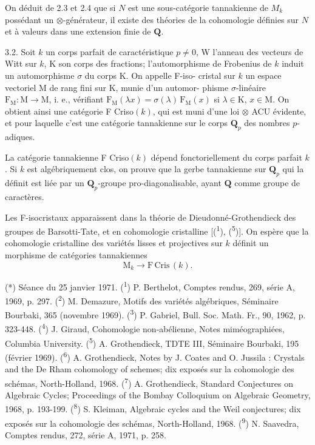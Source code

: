 \documentclass[11pt]{article}
\begin{document}
On déduit de 2.3 et 2.4 que si $N$ est une sous-catégorie tannakienne de $M_k$
possédant un $\otimes$-générateur, il existe des théories de la cohomologie définies
sur $N$ et à valeurs dans une extension finie de $\mathbf{Q}$.

3.2. Soit $k$ un corps parfait de caractéristique $p \neq 0$, W l'anneau des
vecteurs de Witt sur $k$, K son corps des fractions; l'automorphisme de
Frobenius de $k$ induit un automorphisme $\sigma$ du corps K. On appelle F-iso-%
cristal sur $k$ un espace vectoriel M de rang fini sur K, munie d'un automor-%
phisme $\sigma$-linéaire $\mathrm{F}_{\mathrm{M}} : \mathrm{M} \to \mathrm{M}$, i. e., vérifiant $\mathrm{F}_{\mathrm{M}}(\lambda x) = \sigma(\lambda)\, \mathrm{F}_{\mathrm{M}}(x)$ si
$\lambda \in \mathrm{K}$, $x \in \mathrm{M}$. On obtient ainsi une catégorie F Criso$(k)$, qui est muni d'une
loi $\otimes$ ACU évidente, et pour laquelle c'est une catégorie tannakienne sur
le corps $\mathbf{Q}_p$ des nombres $p$-adiques.

La catégorie tannakienne F Criso$(k)$ dépend fonctoriellement du corps
parfait $k$. Si $k$ est algébriquement clos, on prouve que la gerbe tannakienne
sur $\mathbf{Q}_p$ qui la définit est liée par un $\mathbf{Q}_p$-groupe pro-diagonalisable, ayant
$\mathbf{Q}$ comme groupe de caractères.

Les F-isocristaux apparaissent dans la théorie de Dieudonné-Grothendieck
des groupes de Barsotti-Tate, et en cohomologie cristalline [(\textsuperscript{1}), (\textsuperscript{5})]. On
espère que la cohomologie cristalline des variétés lisses et projectives sur $k$
définit un morphisme de catégories tannakiennes
\[ \mathrm{M}_k \to \mathrm{F\,Cris}\,(k). \]

(*) Séance du 25 janvier 1971.
(\textsuperscript{1}) P. Berthelot, Comptes rendus, 269, série A, 1969, p. 297.
(\textsuperscript{2}) M. Demazure, Motifs des variétés algébriques, Séminaire Bourbaki, 365
(novembre 1969).
(\textsuperscript{3}) P. Gabriel, Bull. Soc. Math. Fr., 90, 1962, p. 323-448.
(\textsuperscript{4}) J. Giraud, Cohomologie non-abélienne, Notes miméographiées, Columbia University.
(\textsuperscript{5}) A. Grothendieck, TDTE III, Séminaire Bourbaki, 195 (février 1969).
(\textsuperscript{6}) A. Grothendieck, Notes by J. Coates and O. Jussila : Crystals and the De Rham
cohomology of schemes; dix exposés sur la cohomologie des schémas, North-Holland, 1968.
(\textsuperscript{7}) A. Grothendieck, Standard Conjectures on Algebraic Cycles; Proceedings of the
Bombay Colloquium on Algebraic Geometry, 1968, p. 193-199.
(\textsuperscript{8}) S. Kleiman, Algebraic cycles and the Weil conjectures; dix exposés sur la cohomologie
des schémas, North-Holland, 1968.
(\textsuperscript{9}) N. Saavedra, Comptes rendus, 272, série A, 1971, p. 258.
\end{document}
